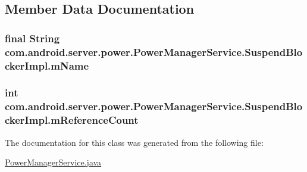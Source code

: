 \subsection{Member Data Documentation}
\hypertarget{classcom_1_1android_1_1server_1_1power_1_1PowerManagerService_1_1SuspendBlockerImpl_ad501d117f4f5989024a31c850c20bf1d}{
\subsubsection[{m\-Name}]{\setlength{\rightskip}{0pt plus 5cm}final String com.\-android.\-server.\-power.\-Power\-Manager\-Service.\-Suspend\-Blocker\-Impl.\-m\-Name\hspace{0.3cm}{\ttfamily [private]}}}\label{classcom_1_1android_1_1server_1_1power_1_1PowerManagerService_1_1SuspendBlockerImpl_ad501d117f4f5989024a31c850c20bf1d}
\hypertarget{classcom_1_1android_1_1server_1_1power_1_1PowerManagerService_1_1SuspendBlockerImpl_a4207d453531a0b152c612f21179ffc79}{
\subsubsection[{m\-Reference\-Count}]{\setlength{\rightskip}{0pt plus 5cm}int com.\-android.\-server.\-power.\-Power\-Manager\-Service.\-Suspend\-Blocker\-Impl.\-m\-Reference\-Count\hspace{0.3cm}{\ttfamily [private]}}}\label{classcom_1_1android_1_1server_1_1power_1_1PowerManagerService_1_1SuspendBlockerImpl_a4207d453531a0b152c612f21179ffc79}


The documentation for this class was generated from the following file\-:\begin{DoxyCompactItemize}
\item 
\hyperlink{PowerManagerService_8java}{Power\-Manager\-Service.\-java}\end{DoxyCompactItemize}
